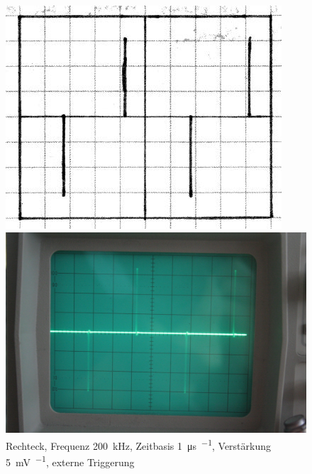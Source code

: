 \begin{figure}
	\centering
	\begin{minipage}{.45\linewidth}
	\includegraphics[width=\linewidth]{Skizzen/IMG_0752-1500.jpg}
	\end{minipage}
	\hfill
	\begin{minipage}{.45\linewidth}
	\includegraphics[width=\linewidth]{Fotos/IMG_0752-1500.jpg}
	\end{minipage}
	\caption{%
		Rechteck, Frequenz \SI{200}{\kilo\hertz}, Zeitbasis \SI{1}{\micro\second\per\division}, Verstärkung \SI{5}{\milli\volt\per\division}, externe Triggerung
	}
	\label{fig:0752}
\end{figure}

